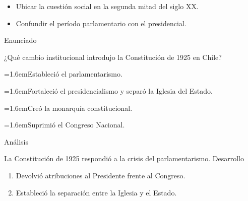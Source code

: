 \documentclass[10pt,a4paper,twocolumn]{article}
\newcommand{\alternativa}[2]{\par\noindent\hangindent=1.6em\hangafter=1\makebox[1.6em][l]{\tecla{#1}}#2\par}
\newcommand{\clave}[1]{\par\smallskip{\sffamily\footnotesize\color{esmeralda} Clave \teclaok{#1}}\par}
\begin{document}
\begin{errorfrecuente}
\begin{itemize}
  \item Ubicar la cuestión social en la segunda mitad del siglo XX.
  \item Confundir el período parlamentario con el presidencial.
\end{itemize}
\end{errorfrecuente}

\begin{ejemplo}
{\sffamily\footnotesize\color{zinc500} Enunciado}\par
¿Qué cambio institucional introdujo la Constitución de 1925 en Chile?
\alternativa{A}{Estableció el parlamentarismo.}
\alternativa{B}{Fortaleció el presidencialismo y separó la Iglesia del Estado.}
\alternativa{C}{Creó la monarquía constitucional.}
\alternativa{D}{Suprimió el Congreso Nacional.}
\clave{B}
{\sffamily\footnotesize\color{zinc500} Análisis}\par La Constitución de 1925 respondió a la crisis del parlamentarismo.
{\sffamily\footnotesize\color{zinc500} Desarrollo}
\begin{enumerate}
  \item Devolvió atribuciones al Presidente frente al Congreso.
  \item Estableció la separación entre la Iglesia y el Estado.
\end{enumerate}
\end{ejemplo}
\end{document}
